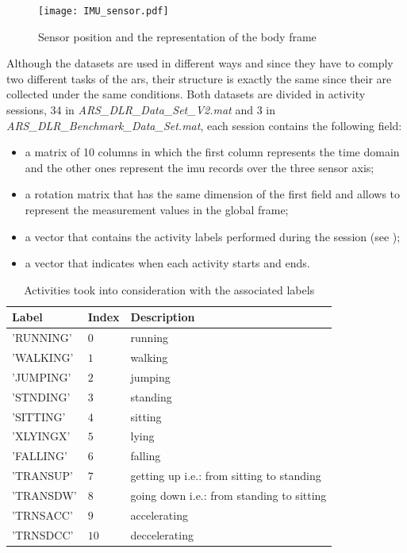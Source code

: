 \begin{figure}[htp]
\texttt{[image: IMU\_sensor.pdf]}
\caption{Sensor position and the representation of the body frame}
\label{fig:IMU}
\end{figure}

Although the datasets are used in different ways and since they have to comply two different tasks of the \gls{ars}, their structure is exactly the same since their are collected under the same conditions.
Both datasets are divided in activity sessions, 34 in \textit{ARS\_DLR\_Data\_Set\_V2.mat} and 3 in \textit{ARS\_DLR\_Benchmark\_Data\_Set.mat}, each session contains the following field:
\begin{itemize}
\item a matrix of 10 columns in which the first column represents the time domain and the other ones represent the \gls{imu} records over the three sensor axis;
\item a rotation matrix that has the same dimension of the first field and allows to represent the measurement values in the global frame;
\item a vector that contains the activity labels performed during the session (see );
\item a vector that indicates when each activity starts and ends.
\end{itemize}

\begin{table}[htp]
\small
	\centering
		\renewcommand{\arraystretch}{1}%
	\begin{tabular}{@{}lll@{}}
	\toprule
	Label & Index & Description\\ \midrule
	'RUNNING' & $0$ & running \\
	'WALKING' & $1$ & walking \\
	'JUMPING' & $2$ & jumping  \\
	'STNDING' & $3$ & standing \\
	'SITTING' & $4$ & sitting\\
	'XLYINGX' & $5$ & lying \\
	'FALLING' & $6$ & falling \\
	'TRANSUP' & $7$ & getting up i.e.: from sitting to standing \\
	'TRANSDW' & $8$ & going down i.e.: from standing to sitting\\
	'TRNSACC' & $9$ & accelerating\\
	'TRNSDCC' & $10$ & deccelerating\\
	\bottomrule
	\end{tabular}
	\caption{Activities took into consideration with the associated labels}
	\label{tab:label}
\end{table}


